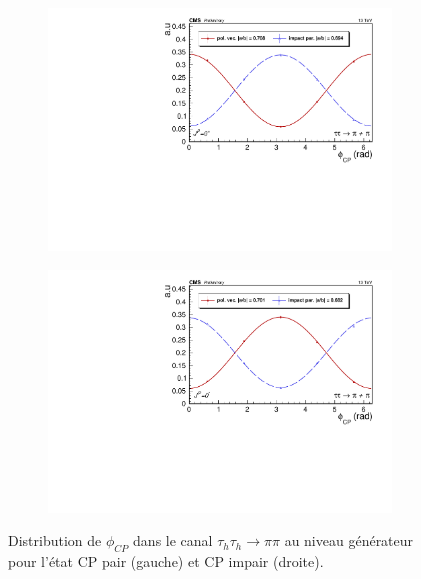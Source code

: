 \begin{figure}[]
  \begin{subfigure}[b]{0.5\linewidth}
    \centering
    \includegraphics[width=\linewidth]{Chapitre6/Images/PIONPION/PIONPION_even_gen.pdf} 
    \caption*{} 
    \vspace{0.5ex}
  \end{subfigure}%
  \begin{subfigure}[b]{0.5\linewidth}
    \centering
    \includegraphics[width=\linewidth]{Chapitre6/Images/PIONPION/PIONPION_odd_gen.pdf} 
    \caption*{} 
    \vspace{0.5ex}
  \end{subfigure} 
  \caption{Distribution de $\phi_{CP}$ dans le canal $\tau_h\tau_h\rightarrow\pi\pi$ au niveau générateur pour l'état CP pair (gauche) et CP impair (droite).}
  \label{CPgenPIPI}
\end{figure}


